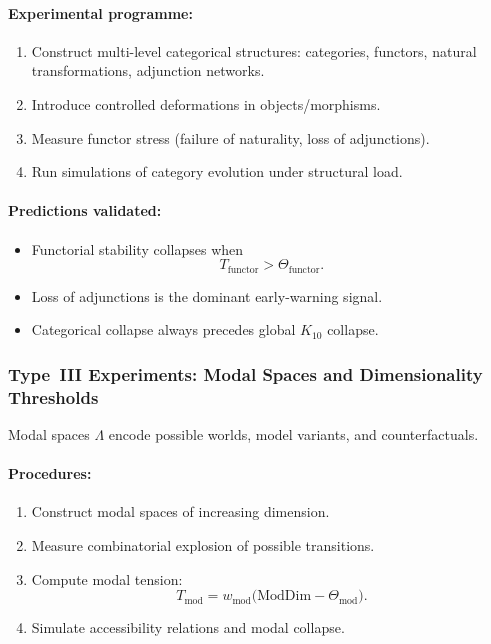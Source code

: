 \paragraph{Experimental programme:}

\begin{enumerate}
    \item Construct multi-level categorical structures:
          categories, functors, natural transformations,
          adjunction networks.
    \item Introduce controlled deformations in objects/morphisms.
    \item Measure functor stress 
          (failure of naturality, loss of adjunctions).
    \item Run simulations of category evolution under structural load.
\end{enumerate}

\paragraph{Predictions validated:}

\begin{itemize}
    \item Functorial stability collapses when
          \[
              T_{\mathrm{functor}} > \Theta_{\mathrm{functor}}.
          \]
    \item Loss of adjunctions is the dominant early-warning signal.
    \item Categorical collapse always precedes global 
          $K_{10}$ collapse.
\end{itemize}



\subsubsection{Type~III Experiments: Modal Spaces and Dimensionality Thresholds}

Modal spaces $\Lambda$ encode possible worlds, model variants, and 
counterfactuals.

\paragraph{Procedures:}

\begin{enumerate}
    \item Construct modal spaces of increasing dimension.
    \item Measure combinatorial explosion of possible transitions.
    \item Compute modal tension:
          \[
              T_{\mathrm{mod}} = 
              w_{\mathrm{mod}}\bigl(
                  \mathrm{ModDim} - \Theta_{\mathrm{mod}}
              \bigr).
          \]
    \item Simulate accessibility relations and modal collapse.
\end{enumerate}

